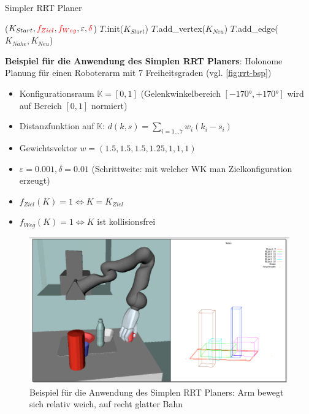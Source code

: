 \begin{algorithm}[h!]
  \caption{Simpler RRT Planer
    \label{alg:rrt-erw}}
  \begin{algorithmic}[1]
    ($K_{Start}, \textcolor{red}{f_{Ziel}}, \textcolor{red}{f_{Weg}}, \varepsilon, \textcolor{red}{\delta}$)
      \State $T$.init($K_{Start}$) 
         
         
        	\State $T$.add\_vertex($K_{Neu}$)
        	\State $T$.add\_edge($K_{Nahe}, K_{Neu}$)
        	 
        		\State {}
        	\EndIf
        \EndIf
      \EndFor
      \State {}
  \end{algorithmic}
\end{algorithm}
\bigskip
\textbf{Beispiel für die Anwendung des Simplen RRT Planers}: Holonome Planung für einen Roboterarm mit 7 Freiheitsgraden (vgl. \autoref{fig:rrt-bsp})
\begin{itemize}
\item Konfigurationsraum $\mathbb{K}= \left[0,1\right]$ (Gelenkwinkelbereich $\left[-170°, +170°\right]$ wird auf Bereich $\left[0,1\right]$ normiert)
\item Distanzfunktion auf $\mathbb{K}$: $d(k,s) = \sum\limits_{i = 1...7} w_i (k_i - s_i)$
\item Gewichtsvektor $w=(1.5,1.5,1.5,1.25,1,1,1)$
\item $\varepsilon = 0.001, \delta = 0.01$ (Schrittweite: mit welcher WK man Zielkonfiguration erzeugt)
\item $f_{Ziel}(K) = 1 \Leftrightarrow K = K_ {Ziel}$
\item $f_{Weg}(K) = 1 \Leftrightarrow K$ ist kollisionsfrei
\end{itemize}
\begin{figure}[h!]
	\centering
	\includegraphics[width=.5\textwidth]{figures/ch04_rrt-bsp.png}
	\caption{Beispiel für die Anwendung des Simplen RRT Planers: Arm bewegt sich relativ weich, auf recht glatter Bahn}
	\label{fig:rrt-bsp}
\end{figure}
